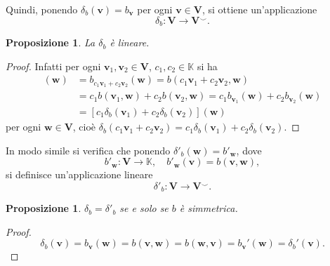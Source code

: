 \documentclass{article}
\theoremstyle{plain}
\newtheorem{prop}[thm]{Proposizione}
\theoremstyle{definition}
\theoremstyle{remark}
\begin{document}
Quindi, ponendo $\delta_b(\mathbf{v}) = b_\mathbf{v}$ per ogni $\mathbf{v} \in \mathbf{V}$, si ottiene un'applicazione
\[
\delta_b : \mathbf{V} \to \mathbf{V}^\smallsmile.
\]

\vspace{10pt}

\begin{bxthm}
\begin{prop}
La $\delta_b$ è lineare.     
\end{prop}
\end{bxthm}
\begin{proof}
Infatti per ogni $\mathbf{v}_1, \mathbf{v}_2 \in \mathbf{V}$, $c_1, c_2 \in \mathbb{K}$ si ha
\begin{align*}
[\delta_b(c_1 \mathbf{v}_1 + c_2 \mathbf{v}_2)](\mathbf{w}) &= b_{c_1 \mathbf{v}_1 + c_2 \mathbf{v}_2}(\mathbf{w}) = b(c_1 \mathbf{v}_1 + c_2 \mathbf{v}_2, \mathbf{w}) \\
&= c_1 b(\mathbf{v}_1, \mathbf{w}) + c_2 b(\mathbf{v}_2, \mathbf{w}) = c_1 b_{\mathbf{v}_1}(\mathbf{w}) + c_2 b_{\mathbf{v}_2}(\mathbf{w}) \\
&= [c_1 \delta_b(\mathbf{v}_1) + c_2 \delta_b(\mathbf{v}_2)](\mathbf{w})
\end{align*}
per ogni $\mathbf{w} \in \mathbf{V}$, cioè $\delta_b(c_1 \mathbf{v}_1 + c_2 \mathbf{v}_2) = c_1 \delta_b(\mathbf{v}_1) + c_2 \delta_b(\mathbf{v}_2)$.    
\end{proof}

\vspace{10pt}

In modo simile si verifica che ponendo $\delta'_b(\mathbf{w}) = b'_\mathbf{w}$, dove 
\[
b'_\mathbf{w} : \mathbf{V} \to \mathbb{K},\quad b'_\mathbf{w}(\mathbf{v}) = b(\mathbf{v}, \mathbf{w}),
\]
si definisce un'applicazione lineare
\[
\delta'_b : \mathbf{V} \to \mathbf{V}^\smallsmile.
\]

\vspace{10pt}

\begin{bxthm}
\begin{prop}
    $\delta_b = \delta'_b$ se e solo se $b$ è simmetrica.
\end{prop}
\end{bxthm}
\begin{proof}
    \[\delta_b(\mathbf{v})=b_{\mathbf{v}}(\mathbf{w})=b(\mathbf{v},\mathbf{w})=b(\mathbf{w},\mathbf{v})=b_{\mathbf{v}}'(\mathbf{w})=\delta_b'(\mathbf{v}).\]
\end{proof}
\end{document}
